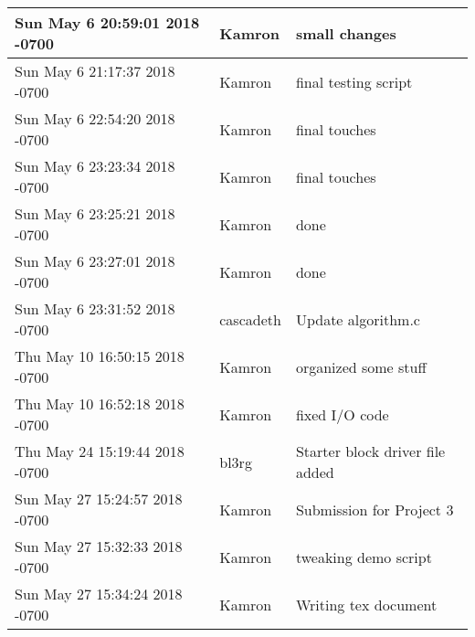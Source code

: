 \begin{tabular}{l l l}
Sun May 6 20:59:01 2018 -0700 & Kamron & small changes\\\hline
Sun May 6 21:17:37 2018 -0700 & Kamron & final testing script\\\hline
Sun May 6 22:54:20 2018 -0700 & Kamron & final touches\\\hline
Sun May 6 23:23:34 2018 -0700 & Kamron & final touches\\\hline
Sun May 6 23:25:21 2018 -0700 & Kamron & done\\\hline
Sun May 6 23:27:01 2018 -0700 & Kamron & done\\\hline
Sun May 6 23:31:52 2018 -0700 & cascadeth & Update algorithm.c\\\hline
Thu May 10 16:50:15 2018 -0700 & Kamron & organized some stuff\\\hline
Thu May 10 16:52:18 2018 -0700 & Kamron & fixed I/O code\\\hline
Thu May 24 15:19:44 2018 -0700 & bl3rg & Starter block driver file added\\\hline
Sun May 27 15:24:57 2018 -0700 & Kamron & Submission for Project 3\\\hline
Sun May 27 15:32:33 2018 -0700 & Kamron & tweaking demo script\\\hline
Sun May 27 15:34:24 2018 -0700 & Kamron & Writing tex document\\\hline\end{tabular}

